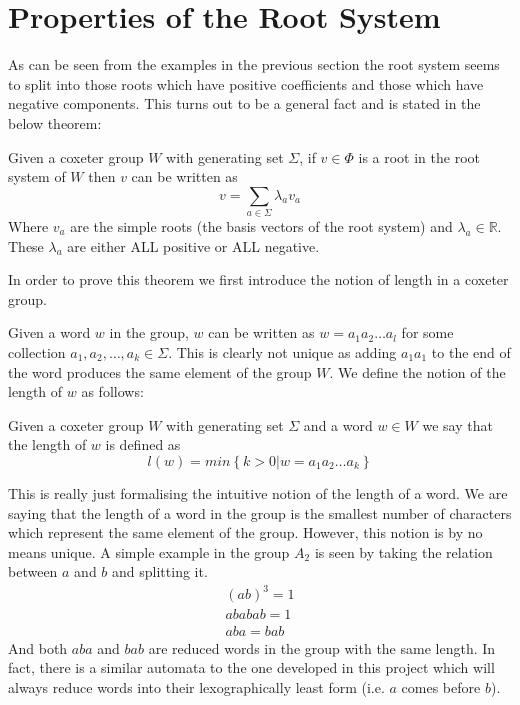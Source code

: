 \documentclass[a4paper,12pt]{article}
\begin{document}

\section{Properties of the Root System}
As can be seen from the examples in the previous section the root system seems to split into those roots which have positive coefficients and those which have negative components. This turns out to be a general fact and is stated in the below theorem:

\begin{thm}
\label{root_system_splits}
	Given a coxeter group $W$ with generating set $\Sigma$, if $v \in \Phi$ is a root in the root system of $W$ then $v$ can be written as
	\[v = \sum_{a \in \Sigma}\lambda_av_a\]
	Where $v_a$ are the simple roots (the basis vectors of the root system) and $\lambda_a \in \mathbb{R}$. These $\lambda_a$ are either ALL positive or ALL negative.
\end{thm}

In order to prove this theorem we first introduce the notion of length in a coxeter group. 

Given a word $w$ in the group, $w$ can be written as $w = a_1a_2 \ldots a_l$ for some collection $a_1, a_2, \ldots, a_k \in \Sigma$. This is clearly not unique as adding $a_1a_1$ to the end of the word produces the same element of the group $W$. We define the notion of the length of $w$ as follows:

\begin{definition}
	Given a coxeter group $W$ with generating set $\Sigma$ and a word $w \in W$ we say that the length of $w$ is defined as
	\[l(w) = min\left\{k > 0 | w = a_1a_2 \ldots a_k\right\}\]
\end{definition}

This is really just formalising the intuitive notion of the length of a word. We are saying that the length of a word in the group is the smallest number of characters which represent the same element of the group. However, this notion is by no means unique. A simple example in the group $A_2$ is seen by taking the relation between $a$ and $b$ and splitting it. 
\begin{align*}
	(ab)^3 = 1 \\
	ababab = 1 \\
	aba = bab
\end{align*}
And both $aba$ and $bab$ are reduced words in the group with the same length. In fact, there is a similar automata to the one developed in this project which will always reduce words into their lexographically least form (i.e. $a$ comes before $b$). 
\end{document}
